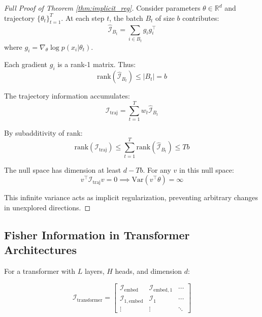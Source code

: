 \documentclass[11pt]{article}
\begin{document}
\begin{proof}[Full Proof of Theorem \ref{thm:implicit_reg}]
Consider parameters $\theta \in \mathbb{R}^d$ and trajectory $\{\theta_t\}_{t=1}^T$. At each step $t$, the batch $B_t$ of size $b$ contributes:
\begin{equation}
\hat{\mathcal{I}}_{B_t} = \sum_{i \in B_t} g_i g_i^\top
\end{equation}
where $g_i = \nabla_\theta \log p(x_i|\theta_t)$.

Each gradient $g_i$ is a rank-1 matrix. Thus:
\begin{equation}
\text{rank}(\hat{\mathcal{I}}_{B_t}) \leq |B_t| = b
\end{equation}

The trajectory information accumulates:
\begin{equation}
\mathcal{I}_{\text{traj}} = \sum_{t=1}^T w_t \hat{\mathcal{I}}_{B_t}
\end{equation}

By subadditivity of rank:
\begin{equation}
\text{rank}(\mathcal{I}_{\text{traj}}) \leq \sum_{t=1}^T \text{rank}(\hat{\mathcal{I}}_{B_t}) \leq Tb
\end{equation}

The null space has dimension at least $d - Tb$. For any $v$ in this null space:
\begin{equation}
v^\top \mathcal{I}_{\text{traj}} v = 0 \implies \text{Var}(v^\top \theta) = \infty
\end{equation}

This infinite variance acts as implicit regularization, preventing arbitrary changes in unexplored directions.
\end{proof}

\subsection{Fisher Information in Transformer Architectures}

For a transformer with $L$ layers, $H$ heads, and dimension $d$:

\begin{equation}
\mathcal{I}_{\text{transformer}} = \begin{bmatrix}
\mathcal{I}_{\text{embed}} & \mathcal{I}_{\text{embed}, 1} & \cdots \\
\mathcal{I}_{1, \text{embed}} & \mathcal{I}_{1} & \cdots \\
\vdots & \vdots & \ddots
\end{bmatrix}
\end{equation}
\end{document}
